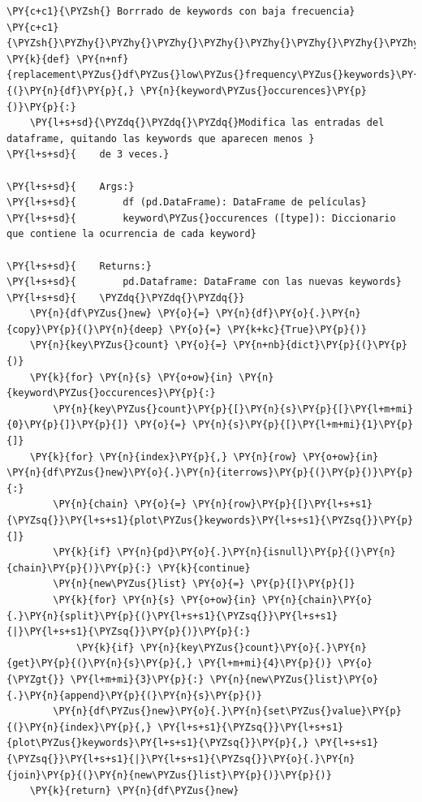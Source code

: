     \begin{tcolorbox}[breakable, size=fbox, boxrule=1pt, pad at break*=1mm,colback=cellbackground, colframe=cellborder]
\begin{Verbatim}[commandchars=\\\{\}]
\PY{c+c1}{\PYZsh{} Borrrado de keywords con baja frecuencia}
\PY{c+c1}{\PYZsh{}\PYZhy{}\PYZhy{}\PYZhy{}\PYZhy{}\PYZhy{}\PYZhy{}\PYZhy{}\PYZhy{}\PYZhy{}\PYZhy{}\PYZhy{}\PYZhy{}\PYZhy{}\PYZhy{}\PYZhy{}\PYZhy{}\PYZhy{}\PYZhy{}\PYZhy{}\PYZhy{}\PYZhy{}\PYZhy{}\PYZhy{}\PYZhy{}\PYZhy{}\PYZhy{}\PYZhy{}\PYZhy{}\PYZhy{}\PYZhy{}\PYZhy{}\PYZhy{}\PYZhy{}\PYZhy{}\PYZhy{}\PYZhy{}\PYZhy{}\PYZhy{}\PYZhy{}\PYZhy{}\PYZhy{}\PYZhy{}\PYZhy{}}
\PY{k}{def} \PY{n+nf}{replacement\PYZus{}df\PYZus{}low\PYZus{}frequency\PYZus{}keywords}\PY{p}{(}\PY{n}{df}\PY{p}{,} \PY{n}{keyword\PYZus{}occurences}\PY{p}{)}\PY{p}{:}
    \PY{l+s+sd}{\PYZdq{}\PYZdq{}\PYZdq{}Modifica las entradas del dataframe, quitando las keywords que aparecen menos }
\PY{l+s+sd}{    de 3 veces.}

\PY{l+s+sd}{    Args:}
\PY{l+s+sd}{        df (pd.DataFrame): DataFrame de películas}
\PY{l+s+sd}{        keyword\PYZus{}occurences ([type]): Diccionario que contiene la ocurrencia de cada keyword}

\PY{l+s+sd}{    Returns:}
\PY{l+s+sd}{        pd.Dataframe: DataFrame con las nuevas keywords}
\PY{l+s+sd}{    \PYZdq{}\PYZdq{}\PYZdq{}}
    \PY{n}{df\PYZus{}new} \PY{o}{=} \PY{n}{df}\PY{o}{.}\PY{n}{copy}\PY{p}{(}\PY{n}{deep} \PY{o}{=} \PY{k+kc}{True}\PY{p}{)}
    \PY{n}{key\PYZus{}count} \PY{o}{=} \PY{n+nb}{dict}\PY{p}{(}\PY{p}{)}
    \PY{k}{for} \PY{n}{s} \PY{o+ow}{in} \PY{n}{keyword\PYZus{}occurences}\PY{p}{:} 
        \PY{n}{key\PYZus{}count}\PY{p}{[}\PY{n}{s}\PY{p}{[}\PY{l+m+mi}{0}\PY{p}{]}\PY{p}{]} \PY{o}{=} \PY{n}{s}\PY{p}{[}\PY{l+m+mi}{1}\PY{p}{]}    
    \PY{k}{for} \PY{n}{index}\PY{p}{,} \PY{n}{row} \PY{o+ow}{in} \PY{n}{df\PYZus{}new}\PY{o}{.}\PY{n}{iterrows}\PY{p}{(}\PY{p}{)}\PY{p}{:}
        \PY{n}{chain} \PY{o}{=} \PY{n}{row}\PY{p}{[}\PY{l+s+s1}{\PYZsq{}}\PY{l+s+s1}{plot\PYZus{}keywords}\PY{l+s+s1}{\PYZsq{}}\PY{p}{]}
        \PY{k}{if} \PY{n}{pd}\PY{o}{.}\PY{n}{isnull}\PY{p}{(}\PY{n}{chain}\PY{p}{)}\PY{p}{:} \PY{k}{continue}
        \PY{n}{new\PYZus{}list} \PY{o}{=} \PY{p}{[}\PY{p}{]}
        \PY{k}{for} \PY{n}{s} \PY{o+ow}{in} \PY{n}{chain}\PY{o}{.}\PY{n}{split}\PY{p}{(}\PY{l+s+s1}{\PYZsq{}}\PY{l+s+s1}{|}\PY{l+s+s1}{\PYZsq{}}\PY{p}{)}\PY{p}{:} 
            \PY{k}{if} \PY{n}{key\PYZus{}count}\PY{o}{.}\PY{n}{get}\PY{p}{(}\PY{n}{s}\PY{p}{,} \PY{l+m+mi}{4}\PY{p}{)} \PY{o}{\PYZgt{}} \PY{l+m+mi}{3}\PY{p}{:} \PY{n}{new\PYZus{}list}\PY{o}{.}\PY{n}{append}\PY{p}{(}\PY{n}{s}\PY{p}{)}
        \PY{n}{df\PYZus{}new}\PY{o}{.}\PY{n}{set\PYZus{}value}\PY{p}{(}\PY{n}{index}\PY{p}{,} \PY{l+s+s1}{\PYZsq{}}\PY{l+s+s1}{plot\PYZus{}keywords}\PY{l+s+s1}{\PYZsq{}}\PY{p}{,} \PY{l+s+s1}{\PYZsq{}}\PY{l+s+s1}{|}\PY{l+s+s1}{\PYZsq{}}\PY{o}{.}\PY{n}{join}\PY{p}{(}\PY{n}{new\PYZus{}list}\PY{p}{)}\PY{p}{)}
    \PY{k}{return} \PY{n}{df\PYZus{}new}  
\end{Verbatim}
\end{tcolorbox}

